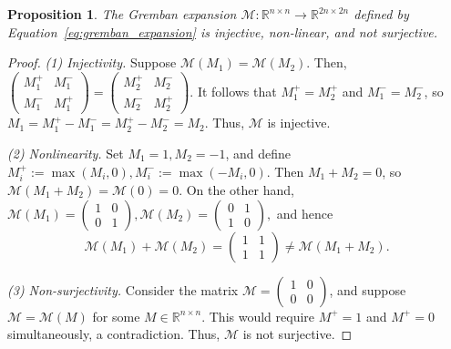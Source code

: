 \documentclass[reprint,onecolumn]{article}
\newtheorem{proposition}[theorem]{Proposition}
\newcommand{\mc}[1]{\mathcal{#1}}
\newcommand{\R}{\mathbb{R}}
\newcommand{\1}{\mathbb{1}}
\newcommand{\0}{\mathbf{0}}
\begin{document}
\begin{proposition}  \label{prop:injective_surjective_nonlinear}
The Gremban expansion \(\mc M \colon \R^{n\times n} \to \R^{2n \times 2n}\) defined by Equation~\eqref{eq:gremban_expansion} is injective, non-linear, and not surjective.
\end{proposition}

\begin{proof}
\emph{(1) Injectivity.} 
Suppose \(\mc M(M_1) = \mc M(M_2)\). Then,
\( \left(
\begin{smallmatrix}
M_1^+ & M_1^- \\
M_1^- & M_1^+
\end{smallmatrix} \right)
= \left(
\begin{smallmatrix}
M_2^+ & M_2^- \\
M_2^- & M_2^+
\end{smallmatrix}\right).
\)
It follows that \(M_1^+ = M_2^+\) and \(M_1^- = M_2^-\), so \(M_1 = M_1^+ - M_1^- = M_2^+ - M_2^- = M_2\). Thus, \(\mc M\) is injective.

\emph{(2) Nonlinearity.} Set $M_1=1, M_2 = -1$, and define $M_i^+:=\max(M_i,0), M_i^-:=\max(-M_i,0)$.
Then \(M_1 + M_2 = 0\), so \(\mc M(M_1+M_2) = \mc M(0) = 0\). On the other hand,
\(
\mc M(M_1) = \left(\begin{smallmatrix} 1 & 0 \\ 0 & 1 \end{smallmatrix} \right), 
\mc M(M_2) = \left(\begin{smallmatrix} 0 & 1\\ 1 & 0 \end{smallmatrix} \right),
\)
and hence
\[
\mc M(M_1) + \mc M(M_2) = 
\begin{pmatrix}
1 & 1 \\
1 & 1
\end{pmatrix}
\neq  \mc M(M_1 + M_2).
\]

\emph{(3) Non-surjectivity.}  Consider the matrix \( \mc M = \left(\begin{smallmatrix} 1 & 0 \\ 0 & 0 \end{smallmatrix} \right) \), and suppose \(\mc M = \mc M(M)\) for some \(M \in \R^{n \times n}\). This would require \(M^+ = 1 \) and \( M^+ = 0\) simultaneously, a contradiction. Thus, $\mc M$ is not surjective. 
\end{proof}
\end{document}
